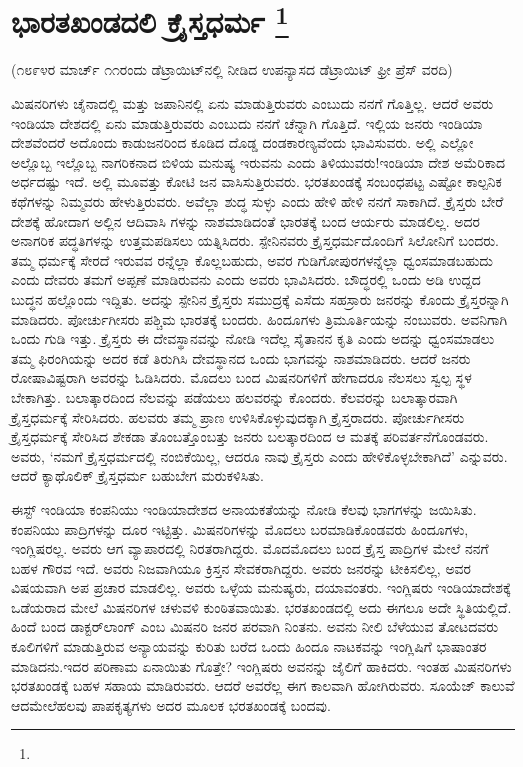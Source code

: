 
\chapter[ಭಾರತಖಂಡದಲಿ ಕ್ರೈಸ್ತಧರ್ಮ ]{ಭಾರತಖಂಡದಲಿ ಕ್ರೈಸ್ತಧರ್ಮ \protect\footnote{}}

\centerline{(೧೮೯೪ರ ಮಾರ್ಚ್​ ೧೧ರಂದು ಡೆಟ್ರಾಯಿಟ್​ನಲ್ಲಿ ನೀಡಿದ ಉಪನ್ಯಾಸದ ಡೆಟ್ರಾಯಿಟ್​ ಫ್ರೀ ಪ್ರೆಸ್​ ವರದಿ)}

ಮಿಷನರಿಗಳು ಚೈನಾದಲ್ಲಿ ಮತ್ತು ಜಪಾನಿನಲ್ಲಿ ಏನು ಮಾಡುತ್ತಿರುವರು ಎಂಬುದು ನನಗೆ ಗೊತ್ತಿಲ್ಲ. ಆದರೆ ಅವರು ಇಂಡಿಯಾ ದೇಶದಲ್ಲಿ ಏನು ಮಾಡುತ್ತಿರುವರು ಎಂಬುದು ನನಗೆ ಚೆನ್ನಾಗಿ ಗೊತ್ತಿದೆ. ಇಲ್ಲಿಯ ಜನರು ಇಂಡಿಯಾ ದೇಶವೆಂದರೆ ಅದೊಂದು ಕಾಡುಜನರಿಂದ ಕೂಡಿದ ದೊಡ್ಡ ದಂಡಕಾರಣ್ಯವೆಂದು ಭಾವಿಸುವರು. ಅಲ್ಲಿ ಎಲ್ಲೋ ಅಲ್ಲೊಬ್ಬ ಇಲ್ಲೊಬ್ಬ ನಾಗರಿಕನಾದ ಬಿಳಿಯ ಮನುಷ್ಯ ಇರುವನು ಎಂದು ತಿಳಿಯುವರು!ಇಂಡಿಯಾ ದೇಶ ಅಮೆರಿಕಾದ ಅರ್ಧದಷ್ಟು ಇದೆ. ಅಲ್ಲಿ ಮೂವತ್ತು ಕೋಟಿ ಜನ ವಾಸಿಸುತ್ತಿರುವರು. ಭರತಖಂಡಕ್ಕೆ ಸಂಬಂಧಪಟ್ಟ ಎಷ್ಟೋ ಕಾಲ್ಪನಿಕ ಕಥೆಗಳನ್ನು ನಿಮ್ಮವರು ಹೇಳುತ್ತಿರುವರು. ಅವೆಲ್ಲಾ ಶುದ್ಧ ಸುಳ್ಳು ಎಂದು ಹೇಳಿ ಹೇಳಿ ನನಗೆ ಸಾಕಾಗಿದೆ. ಕ್ರೈಸ್ತರು ಬೇರೆ ದೇಶಕ್ಕೆ ಹೋದಾಗ ಅಲ್ಲಿನ ಆದಿವಾಸಿ ಗಳನ್ನು ನಾಶಮಾಡಿದಂತೆ ಭಾರತಕ್ಕೆ ಬಂದ ಆರ್ಯರು ಮಾಡಲಿಲ್ಲ. ಅದರ ಅನಾಗರಿಕ ಪದ್ಧತಿಗಳನ್ನು ಉತ್ತಮಪಡಿಸಲು ಯತ್ನಿಸಿದರು. ಸ್ಪೇನಿನವರು ಕ್ರೈಸ್ತಧರ್ಮದೊಂದಿಗೆ ಸಿಲೋನಿಗೆ ಬಂದರು. ತಮ್ಮ ಧರ್ಮಕ್ಕೆ ಸೇರದೆ ಇರುವವ ರನ್ನೆಲ್ಲಾ ಕೊಲ್ಲಬಹುದು, ಅವರ ಗುಡಿಗೋಪುರಗಳನ್ನೆಲ್ಲಾ ಧ್ವಂಸಮಾಡಬಹುದು ಎಂದು ದೇವರು ತಮಗೆ ಅಪ್ಪಣೆ ಮಾಡಿರುವನು ಎಂದು ಅವರು ಭಾವಿಸಿದರು. ಬೌದ್ಧರಲ್ಲಿ ಒಂದು ಅಡಿ ಉದ್ದದ ಬುದ್ಧನ ಹಲ್ಲೊಂದು ಇದ್ದಿತು. ಅದನ್ನು ಸ್ಪೇನಿನ ಕ್ರೈಸ್ತರು ಸಮುದ್ರಕ್ಕೆ ಎಸೆದು ಸಹಸ್ರಾರು ಜನರನ್ನು ಕೊಂದು ಕ್ರೈಸ್ತರನ್ನಾಗಿ ಮಾಡಿದರು. ಪೋರ್ಚುಗೀಸರು ಪಶ್ಚಿಮ ಭಾರತಕ್ಕೆ ಬಂದರು. ಹಿಂದೂಗಳು ತ್ರಿಮೂರ್ತಿಯನ್ನು ನಂಬುವರು. ಅವನಿಗಾಗಿ ಒಂದು ಗುಡಿ ಇತ್ತು. ಕ್ರೈಸ್ತರು ಈ ದೇವಸ್ಥಾನವನ್ನು ನೋಡಿ ಇದೆಲ್ಲ ಸೈತಾನನ ಕೃತಿ ಎಂದು ಅದನ್ನು ಧ್ವಂಸಮಾಡಲು ತಮ್ಮ ಫಿರಂಗಿಯನ್ನು ಅದರ ಕಡೆ ತಿರುಗಿಸಿ ದೇವಸ್ಥಾನದ ಒಂದು ಭಾಗವನ್ನು ನಾಶಮಾಡಿದರು. ಆದರೆ ಜನರು ರೋಷಾವಿಷ್ಟರಾಗಿ ಅವರನ್ನು ಓಡಿಸಿದರು. ಮೊದಲು ಬಂದ ಮಿಷನರಿಗಳಿಗೆ ಹೇಗಾದರೂ ನೆಲಸಲು ಸ್ವಲ್ಪ ಸ್ಥಳ ಬೇಕಾಗಿತ್ತು. ಬಲಾತ್ಕಾರದಿಂದ ನೆಲವನ್ನು ಪಡೆಯಲು ಹಲವರನ್ನು ಕೊಂದರು. ಕೆಲವರನ್ನು ಬಲಾತ್ಕಾರವಾಗಿ ಕ್ರೈಸ್ತಧರ್ಮಕ್ಕೆ ಸೇರಿಸಿದರು. ಹಲವರು ತಮ್ಮ ಪ್ರಾಣ ಉಳಿಸಿಕೊಳ್ಳುವುದಕ್ಕಾಗಿ ಕ್ರೈಸ್ತರಾದರು. ಪೋರ್ಚುಗೀಸರು ಕ್ರೈಸ್ತಧರ್ಮಕ್ಕೆ ಸೇರಿಸಿದ ಶೇಕಡಾ ತೊಂಬತ್ತೊಂಬತ್ತು ಜನರು ಬಲತ್ಕಾರದಿಂದ ಆ ಮತಕ್ಕೆ ಪರಿವರ್ತನೆಗೊಂಡವರು. ಅವರು, ‘ನಮಗೆ ಕ್ರೈಸ್ತಧರ್ಮದಲ್ಲಿ ನಂಬಿಕೆಯಿಲ್ಲ, ಆದರೂ ನಾವು ಕ್ರೈಸ್ತರು ಎಂದು ಹೇಳಿಕೊಳ್ಳಬೇಕಾಗಿದೆ’ ಎನ್ನುವರು. ಆದರೆ ಕ್ಯಾಥೊಲಿಕ್​ ಕ್ರೈಸ್ತಧರ್ಮ ಬಹುಬೇಗ ಮರುಕಳಿಸಿತು.

ಈಸ್ಟ್ ಇಂಡಿಯಾ ಕಂಪನಿಯು ಇಂಡಿಯಾದೇಶದ ಅನಾಯಕತೆಯನ್ನು ನೋಡಿ ಕೆಲವು ಭಾಗಗಳನ್ನು ಜಯಿಸಿತು. ಕಂಪನಿಯು ಪಾದ್ರಿಗಳನ್ನು ದೂರ ಇಟ್ಟಿತ್ತು. ಮಿಷನರಿಗಳನ್ನು ಮೊದಲು ಬರಮಾಡಿಕೊಂಡವರು ಹಿಂದೂಗಳು, ಇಂಗ್ಲಿಷರಲ್ಲ. ಅವರು ಆಗ ವ್ಯಾಪಾರದಲ್ಲಿ ನಿರತರಾಗಿದ್ದರು. ಮೊದಮೊದಲು ಬಂದ ಕ್ರೈಸ್ತ ಪಾದ್ರಿಗಳ ಮೇಲೆ ನನಗೆ ಬಹಳ ಗೌರವ ಇದೆ. ಅವರು ನಿಜವಾಗಿಯೂ ಕ್ರಿಸ್ತನ ಸೇವಕರಾಗಿದ್ದರು. ಅವರು ಜನರನ್ನು ಟೀಕಿಸಲಿಲ್ಲ, ಅವರ ವಿಷಯವಾಗಿ ಅಪ ಪ್ರಚಾರ ಮಾಡಲಿಲ್ಲ. ಅವರು ಒಳ್ಳೆಯ ಮನುಷ್ಯರು, ದಯಾವಂತರು. ಇಂಗ್ಲಿಷರು ಇಂಡಿಯಾದೇಶಕ್ಕೆ ಒಡೆಯರಾದ ಮೇಲೆ ಮಿಷನರಿಗಳ ಚಳುವಳಿ ಕುಂಠಿತವಾಯಿತು. ಭರತಖಂಡದಲ್ಲಿ ಅದು ಈಗಲೂ ಅದೇ ಸ್ಥಿತಿಯಲ್ಲಿದೆ. ಹಿಂದೆ ಬಂದ ಡಾಕ್ಟರ್​ ಲಾಂಗ್​ ಎಂಬ ಮಿಷನರಿ ಜನರ ಪರವಾಗಿ ನಿಂತನು. ಅವನು ನೀಲಿ ಬೆಳೆಯುವ ತೋಟದವರು ಕೂಲಿಗಳಿಗೆ ಮಾಡುತ್ತಿರುವ ಅನ್ಯಾಯವನ್ನು ಕುರಿತು ಬರೆದ ಒಂದು ಹಿಂದೂ ನಾಟಕವನ್ನು ಇಂಗ್ಲಿಷಿಗೆ ಭಾಷಾಂತರ ಮಾಡಿದನು.ಇದರ ಪರಿಣಾಮ ಏನಾಯಿತು ಗೊತ್ತೇ? ಇಂಗ್ಲಿಷರು ಅವನನ್ನು ಜೈಲಿಗೆ ಹಾಕಿದರು. ಇಂತಹ ಮಿಷನರಿಗಳು ಭರತಖಂಡಕ್ಕೆ ಬಹಳ ಸಹಾಯ ಮಾಡಿರುವರು. ಆದರೆ ಅವರೆಲ್ಲ ಈಗ ಕಾಲವಾಗಿ ಹೋಗಿರುವರು. ಸೂಯೆಜ್​ ಕಾಲುವೆ ಆದಮೇಲೆಹಲವು ಪಾಪಕೃತ್ಯಗಳು ಅದರ ಮೂಲಕ ಭರತಖಂಡಕ್ಕೆ ಬಂದವು.

